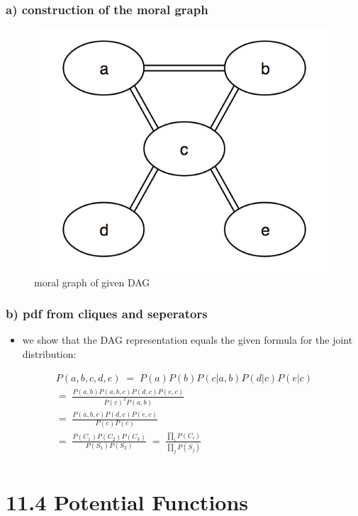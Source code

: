 \documentclass[10 pt]{beamer}
\begin{document}
\begin{frame}
  \frametitle{a) construction of the moral graph}

\begin{figure}[h]
  \centering
  \includegraphics[width=6 cm]{moral_graph.png}
  \caption{moral graph of given DAG}
\end{figure}

\end{frame}
\begin{frame}
  \frametitle{b) pdf from cliques and seperators}

\begin{itemize}
\item we show that the DAG representation equals the given formula for the joint distribution:
\end{itemize}

\begin{eqnarray}
P(a,b,c,d,e) \;=\; P(a)P(b)P(c|a,b)P(d|c)P(e|c) \\
=\; \frac{P(a,b)P(a,b,c)P(d,c)P(e,c)}{P(c)^2P(a,b)} \\
=\; \frac{P(a,b,c)P(d,c)P(e,c)}{P(c)P(c)}\\
=\; \frac{P(C_1)P(C_2)P(C_3)}{P(S_1)P(S_2)}\;=\; \frac{\prod_i P(C_i)}{\prod_j P(S_j)} \\
\end{eqnarray}


\end{frame}

\section*{11.4 Potential Functions}
\end{document}
